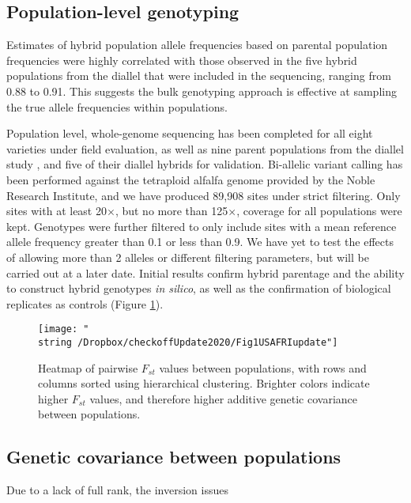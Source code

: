 \documentclass[12pt, letterpaper]{article}
\begin{document}
\subsection{Population-level genotyping}

Estimates of hybrid population allele frequencies based on parental population frequencies were highly correlated with those observed in the five hybrid populations from the diallel that were included in the sequencing, ranging from 0.88 to 0.91. This suggests the bulk genotyping approach is effective at sampling the true allele frequencies within populations. 



Population level, whole-genome sequencing has been completed for all eight varieties under field evaluation, as well as nine parent populations from the diallel study \parencite{segovia2004}, and five of their diallel hybrids for validation. Bi-allelic variant calling has been performed against the tetraploid alfalfa genome provided by the Noble Research Institute, and we have produced 89,908 sites under strict filtering. Only sites with at least 20$\times$, but no more than 125$\times$, coverage for all populations were kept. Genotypes were further filtered to only include sites with a mean reference allele frequency greater than 0.1 or less than 0.9. We have yet to test the effects of allowing more than 2 alleles or different filtering parameters, but will be carried out at a later date. Initial results confirm hybrid parentage and the ability to construct hybrid genotypes \emph{in silico}, as well as the confirmation of biological replicates as controls (Figure \ref{heatmap}). 

\begin{figure}
\texttt{[image: "\\string~/Dropbox/checkoffUpdate2020/Fig1USAFRIupdate"]}
\caption{Heatmap of pairwise $F_{st}$ values between populations, with rows and columns sorted using hierarchical clustering. Brighter colors indicate higher $F_{st}$ values, and therefore higher additive genetic covariance between populations.}
\label{heatmap}
\end{figure}

\subsection{Genetic covariance between populations}


Due to a lack of full rank, the inversion issues 
\end{document}
